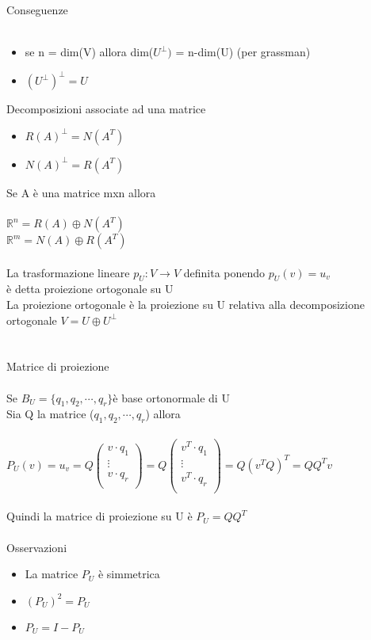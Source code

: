 \documentclass{article}
\begin{document}
Conseguenze\\\\
\begin{itemize}
    \item se n = dim(V) allora dim(\(U^\perp)\) = n-dim(U) (per grassman)\\
    \item \((U^\perp)^\perp=U\)
\end{itemize}
Decomposizioni associate ad una matrice\\
\begin{itemize}
    \item \(R(A)^\perp=N(A^T)\)
    \item \(N(A)^\perp=R(A^T)\)
\end{itemize}
Se A è una matrice mxn allora\\\\
\(\mathbb{R}^n=R(A) \oplus N(A^T)\)\\
\(\mathbb{R}^m=N(A) \oplus R(A^T)\)\\\\
La trasformazione lineare \(p_U:V\rightarrow{}V\) definita ponendo \(p_U(v)=u_v\)\\
è detta proiezione ortogonale su U\\
La proiezione ortogonale è la proiezione su U relativa alla decomposizione ortogonale \(V=U\oplus U^\perp\)\\\\\\
{\large Matrice di proiezione}\\\\
Se \(B_U = \{q_1,q_2,\cdots,q_r\}\)è base ortonormale di U\\
Sia Q la matrice (\(q_1,q_2,\cdots,q_r\)) allora \\\\
\(P_U(v)= u_v = Q\left(
\begin{array}{c}
    v\cdot q_1\\
    \vdots    \\
    v\cdot q_r\\
\end{array}
\right) =
Q\left(
\begin{array}{c}
    v^T\cdot q_1\\
    \vdots    \\
    v^T\cdot q_r\\
\end{array}
\right) = 
Q(v^T Q)^T=QQ^Tv
\)\\\\
Quindi la matrice di proiezione su U è \(P_U=QQ^T\)\\\\
Osservazioni\\
\begin{itemize}
    \item La matrice \(P_U\) è simmetrica
    \item \((P_U)^2=P_U\)
    \item \(P_U=I-P_U\)
\end{itemize}
\end{document}
